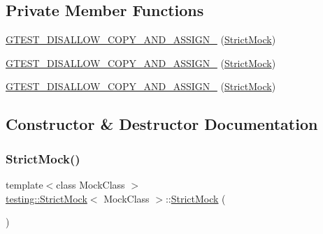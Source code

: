 \subsection*{Private Member Functions}
\begin{DoxyCompactItemize}
\item 
\mbox{\hyperlink{classtesting_1_1_strict_mock_af8425a436acea9e665a223971bac8a71}{G\+T\+E\+S\+T\+\_\+\+D\+I\+S\+A\+L\+L\+O\+W\+\_\+\+C\+O\+P\+Y\+\_\+\+A\+N\+D\+\_\+\+A\+S\+S\+I\+G\+N\+\_\+}} (\mbox{\hyperlink{classtesting_1_1_strict_mock}{Strict\+Mock}})
\item 
\mbox{\hyperlink{classtesting_1_1_strict_mock_af8425a436acea9e665a223971bac8a71}{G\+T\+E\+S\+T\+\_\+\+D\+I\+S\+A\+L\+L\+O\+W\+\_\+\+C\+O\+P\+Y\+\_\+\+A\+N\+D\+\_\+\+A\+S\+S\+I\+G\+N\+\_\+}} (\mbox{\hyperlink{classtesting_1_1_strict_mock}{Strict\+Mock}})
\item 
\mbox{\hyperlink{classtesting_1_1_strict_mock_af8425a436acea9e665a223971bac8a71}{G\+T\+E\+S\+T\+\_\+\+D\+I\+S\+A\+L\+L\+O\+W\+\_\+\+C\+O\+P\+Y\+\_\+\+A\+N\+D\+\_\+\+A\+S\+S\+I\+G\+N\+\_\+}} (\mbox{\hyperlink{classtesting_1_1_strict_mock}{Strict\+Mock}})
\end{DoxyCompactItemize}


\subsection{Constructor \& Destructor Documentation}
\mbox{\label{classtesting_1_1_strict_mock_ad609d745db75306dd3b360b5410923fe}} 
\subsubsection{\texorpdfstring{StrictMock()}{StrictMock()}\hspace{0.1cm}{\footnotesize\ttfamily [1/17]}}
{\footnotesize\ttfamily template$<$class Mock\+Class $>$ \\
\mbox{\hyperlink{classtesting_1_1_strict_mock}{testing\+::\+Strict\+Mock}}$<$ Mock\+Class $>$\+::\mbox{\hyperlink{classtesting_1_1_strict_mock}{Strict\+Mock}} (\begin{DoxyParamCaption}{ }\end{DoxyParamCaption})\hspace{0.3cm}{\ttfamily [inline]}}

